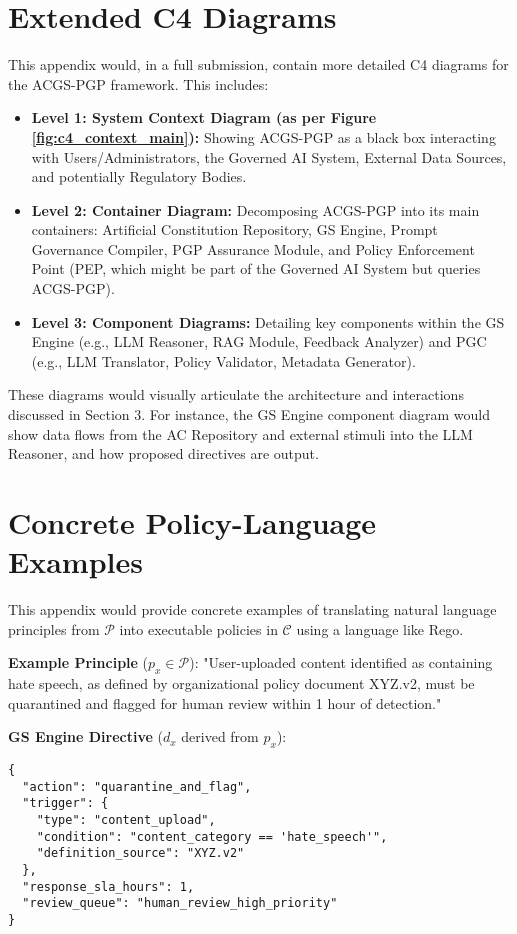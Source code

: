 \documentclass[sigconf,review,screen]{acmart}
\begin{document}



\appendix

\section{Extended C4 Diagrams}
\label{app:c4_diagrams}
This appendix would, in a full submission, contain more detailed C4 diagrams \cite{brown2020software} for the ACGS-PGP framework. This includes:
\begin{itemize}
    \item \textbf{Level 1: System Context Diagram (as per Figure \ref{fig:c4_context_main}):} Showing ACGS-PGP as a black box interacting with Users/Administrators, the Governed AI System, External Data Sources, and potentially Regulatory Bodies.
    \item \textbf{Level 2: Container Diagram:} Decomposing ACGS-PGP into its main containers: Artificial Constitution Repository, GS Engine, Prompt Governance Compiler, PGP Assurance Module, and Policy Enforcement Point (PEP, which might be part of the Governed AI System but queries ACGS-PGP).
    \item \textbf{Level 3: Component Diagrams:} Detailing key components within the GS Engine (e.g., LLM Reasoner, RAG Module, Feedback Analyzer) and PGC (e.g., LLM Translator, Policy Validator, Metadata Generator).
\end{itemize}
These diagrams would visually articulate the architecture and interactions discussed in Section 3. For instance, the GS Engine component diagram would show data flows from the AC Repository and external stimuli into the LLM Reasoner, and how proposed directives are output.

\section{Concrete Policy-Language Examples}
\label{app:policy_examples}
This appendix would provide concrete examples of translating natural language principles from $\mathcal{P}$ into executable policies in $\mathcal{C}$ using a language like Rego.

\textbf{Example Principle} ($p_x \in \mathcal{P}$):
"User-uploaded content identified as containing hate speech, as defined by organizational policy document XYZ.v2, must be quarantined and flagged for human review within 1 hour of detection."

\textbf{GS Engine Directive} ($d_x$ derived from $p_x$):
\begin{lstlisting}[caption={GS Engine Directive Example},label={lst:gs_directive},basicstyle=\ttfamily\footnotesize,breaklines=true,keepspaces=true]
{
  "action": "quarantine_and_flag",
  "trigger": {
    "type": "content_upload",
    "condition": "content_category == 'hate_speech'",
    "definition_source": "XYZ.v2"
  },
  "response_sla_hours": 1,
  "review_queue": "human_review_high_priority"
}
\end{lstlisting}
\end{document}
